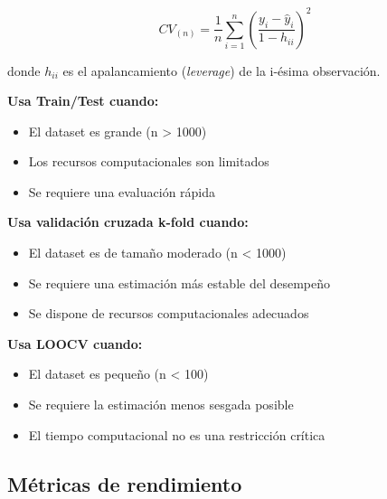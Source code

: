 \documentclass[
  letterpaper,
  DIV=11,
  numbers=noendperiod]{scrreprt}
\providecommand{\tightlist}{%
  \setlength{\itemsep}{0pt}\setlength{\parskip}{0pt}}
\begin{document}
\[CV_{(n)} = \frac{1}{n}\sum_{i=1}^{n}\left(\frac{y_i - \hat{y}_i}{1-h_{ii}}\right)^2\]

donde \(h_{ii}\) es el apalancamiento (\emph{leverage}) de la i-ésima
observación.

\begin{tcolorbox}[enhanced jigsaw, breakable, toprule=.15mm, bottomtitle=1mm, coltitle=black, colbacktitle=quarto-callout-important-color!10!white, titlerule=0mm, opacitybacktitle=0.6, bottomrule=.15mm, toptitle=1mm, title=\textcolor{quarto-callout-important-color}{\faExclamation}\hspace{0.5em}{Guía para seleccionar estrategia de validación}, arc=.35mm, rightrule=.15mm, opacityback=0, colframe=quarto-callout-important-color-frame, leftrule=.75mm, left=2mm, colback=white]

\textbf{Usa Train/Test cuando:}

\begin{itemize}
\tightlist
\item
  El dataset es grande (n \textgreater{} 1000)
\item
  Los recursos computacionales son limitados\\
\item
  Se requiere una evaluación rápida
\end{itemize}

\textbf{Usa validación cruzada k-fold cuando:}

\begin{itemize}
\tightlist
\item
  El dataset es de tamaño moderado (n \textless{} 1000)
\item
  Se requiere una estimación más estable del desempeño
\item
  Se dispone de recursos computacionales adecuados
\end{itemize}

\textbf{Usa LOOCV cuando:}

\begin{itemize}
\tightlist
\item
  El dataset es pequeño (n \textless{} 100)
\item
  Se requiere la estimación menos sesgada posible
\item
  El tiempo computacional no es una restricción crítica
\end{itemize}

\end{tcolorbox}

\subsection{Métricas de rendimiento}\label{muxe9tricas-de-rendimiento}
\end{document}
